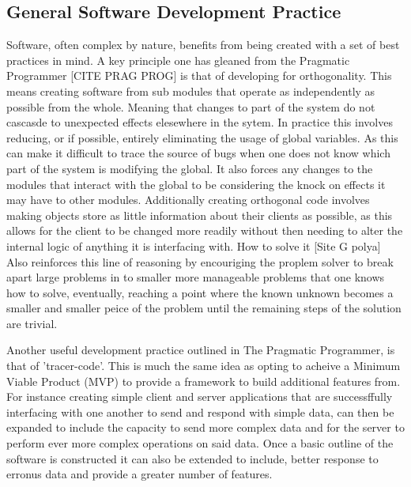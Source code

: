   \subsection{General Software Development Practice}
    Software, often complex by nature, benefits from being created with a set of best practices in mind. A key principle one has gleaned from the Pragmatic Programmer [CITE PRAG PROG] is that of developing for orthogonality. This means creating software from sub modules that operate as independently as possible from the whole. Meaning that changes to part of the system do not cascasde to unexpected effects elesewhere in the sytem. In practice this involves reducing, or if possible, entirely eliminating the usage of global variables. As this can make it difficult to trace the source of bugs when one does not know which part of the system is modifying the global. It also forces any changes to the modules that interact with the global to be considering the knock on effects it may have to other modules. Additionally creating orthogonal code involves making objects store as little information about their clients as possible, as this allows for the client to be changed more readily without then needing to alter the internal logic of anything it is interfacing with. How to solve it [Site G polya] Also reinforces this line of reasoning by encouriging the proplem solver to break apart large problems in to smaller more manageable problems that one knows how to solve, eventually, reaching a point where the known unknown becomes a smaller and smaller peice of the problem until the remaining steps of the solution are trivial.
    \par
    Another useful development practice outlined in The Pragmatic Programmer, is that of 'tracer-code'. This is much the same idea as opting to acheive a Minimum Viable Product (MVP) to provide a framework to build additional features from. For instance creating simple client and server applications that are successffully interfacing with one another to send and respond with simple data, can then be expanded to include the capacity to send more complex data and for the server to perform ever more complex operations on said data. Once a basic outline of the software is constructed it can also be extended to include, better response to erronus data and provide a greater number of features.
    \par
